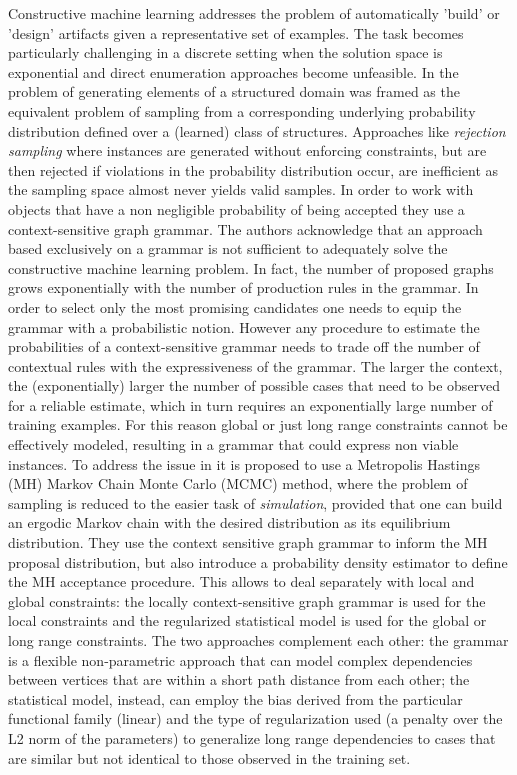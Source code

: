 \documentclass{article}
\begin{document}
Constructive machine learning addresses the problem of automatically 'build'
or 'design' artifacts given a representative set of examples. The task becomes
particularly challenging in a discrete setting when the solution space is
exponential and direct enumeration approaches become unfeasible. In
\cite{costa16} the problem of generating elements of a structured domain was
framed as the equivalent problem of sampling from a corresponding underlying
probability distribution defined over a (learned) class of structures.
Approaches like {\em rejection sampling} where instances are generated without
enforcing constraints, but are then rejected if violations in the probability
distribution occur, are inefficient as the sampling space almost never yields
valid samples. In order to work with objects that have a non negligible
probability of being accepted they use a context-sensitive graph grammar. The
authors acknowledge that an approach based exclusively on a grammar is not
sufficient to adequately solve the constructive machine learning problem. In
fact, the number of proposed graphs grows exponentially with the number of
production rules in the grammar. In order to select only the most promising
candidates one needs to equip the grammar with a probabilistic notion. However
any procedure to estimate the probabilities of a context-sensitive grammar
needs to trade off the number of contextual rules with the expressiveness of
the grammar. The larger the context, the (exponentially) larger the number of
possible cases that need to be observed for a reliable estimate, which in turn
requires an exponentially large number of training examples. For this reason
global or just long range constraints cannot be effectively modeled, resulting
in a grammar that could express non viable instances. To address the issue in
\cite{costa16} it is proposed to use a Metropolis Hastings (MH) Markov Chain
Monte Carlo (MCMC) method, where the problem of sampling is reduced to the
easier task of {\em simulation}, provided that one can build an ergodic Markov
chain with the desired distribution as its equilibrium distribution. They use
the context sensitive graph grammar to inform the MH proposal distribution,
but also introduce a probability density estimator to define the MH acceptance
procedure. This allows to deal separately with local and global constraints:
the locally context-sensitive graph grammar is used for the local constraints
and the regularized statistical model is used for the global or long range
constraints. The two approaches complement each other: the grammar is a
flexible non-parametric approach that can model complex dependencies between
vertices that are within a short path distance from each other; the
statistical model, instead, can employ the bias derived from the particular
functional family (linear) and the type of regularization used (a penalty over
the L2 norm of the parameters) to generalize long range dependencies to cases
that are similar but not identical to those observed in the training set.
\end{document}
